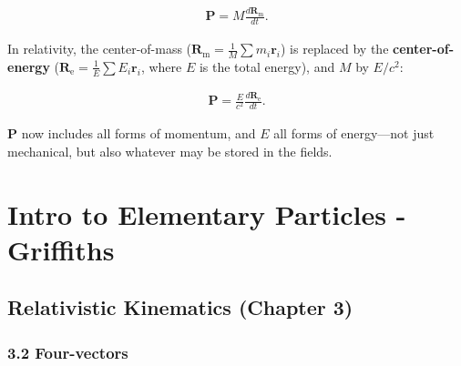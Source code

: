 \documentclass[12pt]{book}
\newcommand{\bm}[1]{\boldsymbol{#1}}
\begin{document}
        \begin{align}
        \bm{P} = M \frac{d\bm{R}_\text{m}}{dt}.
        \end{align}
        
        In relativity, the center-of-mass (\(\bm{R}_\text{m} = \frac{1}{M} \sum m_i \bm{r}_i\)) is replaced by the \textbf{center-of-energy} (\(\bm{R}_\text{e} = \frac{1}{E} \sum E_i \bm{r}_i\), where \(E\) is the total energy), and \(M\) by \(E/c^2\):
        
        \begin{align}
        \bm{P} = \frac{E}{c^2} \frac{d\bm{R}_\text{e}}{dt}.
        \end{align}
        
        \(\bm{P}\) now includes all forms of momentum, and \(E\) all forms of energy—not just mechanical, but also whatever may be stored in the fields.
        
\chapter{Intro to Elementary Particles - Griffiths}

    \section{Relativistic Kinematics (Chapter 3)}
        \subsection{3.2 Four-vectors}
\end{document}
